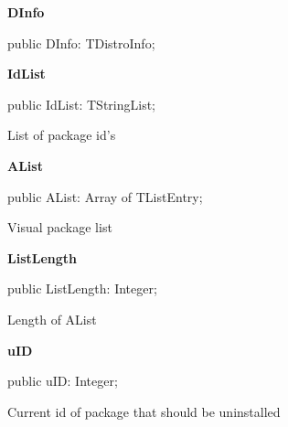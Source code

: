 \documentclass{report}
\newif\ifpdf
\begin{document}
\begin{list}{}
\begin{flushleft}
\ifpdf
\end{flushleft}
\fi


\par  \label{manager.TmnFrm-DInfo}
\item[\textbf{DInfo}\hfill]
\ifpdf
\begin{flushleft}
\fi
\begin{ttfamily}
public DInfo: TDistroInfo;\end{ttfamily}

\ifpdf
\end{flushleft}
\fi


\par  \label{manager.TmnFrm-IdList}
\item[\textbf{IdList}\hfill]
\ifpdf
\begin{flushleft}
\fi
\begin{ttfamily}
public IdList: TStringList;\end{ttfamily}

\ifpdf
\end{flushleft}
\fi


\par List of package id's\label{manager.TmnFrm-AList}
\item[\textbf{AList}\hfill]
\ifpdf
\begin{flushleft}
\fi
\begin{ttfamily}
public AList: Array of TListEntry;\end{ttfamily}

\ifpdf
\end{flushleft}
\fi


\par Visual package list\label{manager.TmnFrm-ListLength}
\item[\textbf{ListLength}\hfill]
\ifpdf
\begin{flushleft}
\fi
\begin{ttfamily}
public ListLength: Integer;\end{ttfamily}

\ifpdf
\end{flushleft}
\fi


\par Length of AList\label{manager.TmnFrm-uID}
\item[\textbf{uID}\hfill]
\ifpdf
\begin{flushleft}
\fi
\begin{ttfamily}
public uID: Integer;\end{ttfamily}

\ifpdf
\end{flushleft}
\fi


\par Current id of package that should be uninstalled\end{list}
\end{document}

